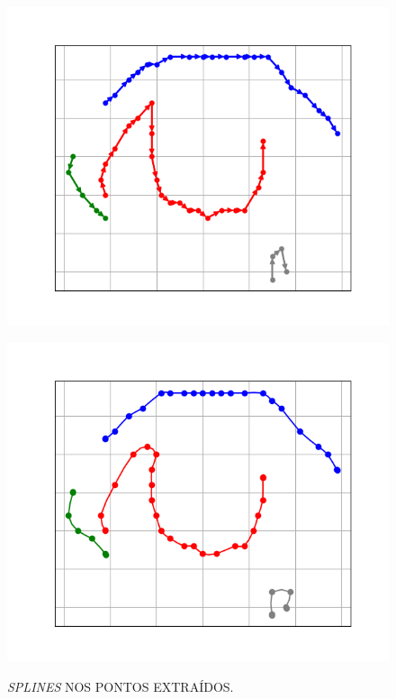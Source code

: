 \begin{figure}[h!]
    \caption{\textit{SPLINES} NOS PONTOS EXTRAÍDOS.}
    \centering
    \begin{minipage}[b]{0.45\textwidth}
        \centering
        \includegraphics[width=1\linewidth]{fig/07_sorted_points_right_eye.png}
        \label{fig:reordenacao}
    \end{minipage}
    \hfill
    \begin{minipage}[b]{0.45\textwidth}
        \centering
        \includegraphics[width=1\linewidth]{fig/08_spline_plot_right_eye.png}
        \label{fig:spline}
    \end{minipage}
    \label{fig:splines_resultados}
\end{figure}





